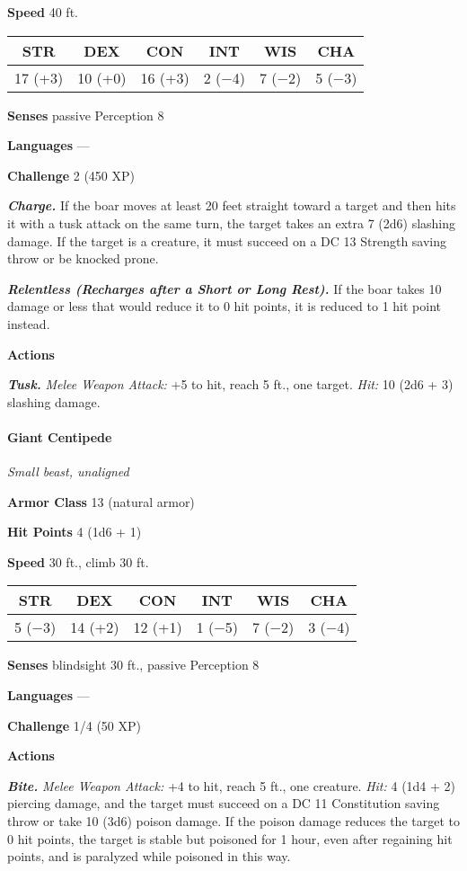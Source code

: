 \documentclass[
]{article}
\begin{document}
\textbf{Speed} 40 ft.

\begin{longtable}[]{@{}cccccc@{}}
\toprule
STR & DEX & CON & INT & WIS & CHA\tabularnewline
\midrule
\endhead
17 (+3) & 10 (+0) & 16 (+3) & 2 (−4) & 7 (−2) & 5 (−3)\tabularnewline
\bottomrule
\end{longtable}

\textbf{Senses} passive Perception 8

\textbf{Languages} ---

\textbf{Challenge} 2 (450 XP)

\emph{\textbf{Charge.}} If the boar moves at least 20 feet straight
toward a target and then hits it with a tusk attack on the same turn,
the target takes an extra 7 (2d6) slashing damage. If the target is a
creature, it must succeed on a DC 13 Strength saving throw or be knocked
prone.

\emph{\textbf{Relentless (Recharges after a Short or Long Rest).}} If
the boar takes 10 damage or less that would reduce it to 0 hit points,
it is reduced to 1 hit point instead.

\textbf{Actions}

\emph{\textbf{Tusk.}} \emph{Melee Weapon Attack:} +5 to hit, reach 5
ft., one target. \emph{Hit:} 10 (2d6 + 3) slashing damage.

\hypertarget{giant-centipede}{%
\paragraph{Giant Centipede}\label{giant-centipede}}

\emph{Small beast, unaligned}

\textbf{Armor Class} 13 (natural armor)

\textbf{Hit Points} 4 (1d6 + 1)

\textbf{Speed} 30 ft., climb 30 ft.

\begin{longtable}[]{@{}cccccc@{}}
\toprule
STR & DEX & CON & INT & WIS & CHA\tabularnewline
\midrule
\endhead
5 (−3) & 14 (+2) & 12 (+1) & 1 (−5) & 7 (−2) & 3 (−4)\tabularnewline
\bottomrule
\end{longtable}

\textbf{Senses} blindsight 30 ft., passive Perception 8

\textbf{Languages} ---

\textbf{Challenge} 1/4 (50 XP)

\textbf{Actions}

\emph{\textbf{Bite.}} \emph{Melee Weapon Attack:} +4 to hit, reach 5
ft., one creature. \emph{Hit:} 4 (1d4 + 2) piercing damage, and the
target must succeed on a DC 11 Constitution saving throw or take 10
(3d6) poison damage. If the poison damage reduces the target to 0 hit
points, the target is stable but poisoned for 1 hour, even after
regaining hit points, and is paralyzed while poisoned in this way.
\end{document}
